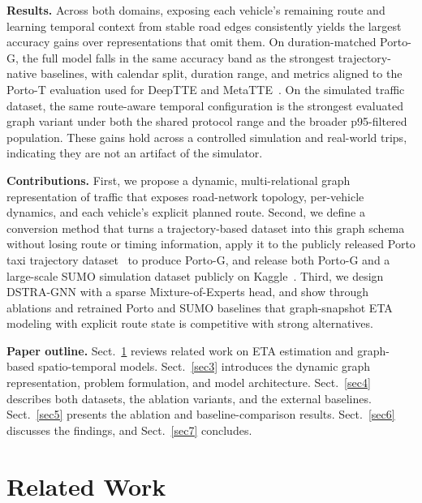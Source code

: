 \documentclass[pdflatex,sn-basic,Numbered]{sn-jnl}%
\begin{document}
\textbf{Results.} Across both domains, exposing each vehicle's remaining route and learning temporal context from stable road edges consistently yields the largest accuracy gains over representations that omit them. On duration-matched Porto-G, the full model falls in the same accuracy band as the strongest trajectory-native baselines, with calendar split, duration range, and metrics aligned to the Porto-T evaluation used for DeepTTE and MetaTTE~\cite{deepTTE2018,wang2022metatte}. On the simulated traffic dataset, the same route-aware temporal configuration is the strongest evaluated graph variant under both the shared protocol range and the broader p95-filtered population. These gains hold across a controlled simulation and real-world trips, indicating they are not an artifact of the simulator.

\textbf{Contributions.} First, we propose a dynamic, multi-relational graph representation of traffic that exposes road-network topology, per-vehicle dynamics, and each vehicle's explicit planned route. Second, we define a conversion method that turns a trajectory-based dataset into this graph schema without losing route or timing information, apply it to the publicly released Porto taxi trajectory dataset~\cite{moreira2013porto} to produce Porto-G, and release both Porto-G and a large-scale SUMO simulation dataset publicly on Kaggle~\cite{tordjman2026sumokaggle,tordjman2026portokaggle}. Third, we design DSTRA-GNN with a sparse Mixture-of-Experts head, and show through ablations and retrained Porto and SUMO baselines that graph-snapshot ETA modeling with explicit route state is competitive with strong alternatives.

\textbf{Paper outline.} Sect.~\ref{sec2} reviews related work on ETA estimation and graph-based spatio-temporal models. Sect.~\ref{sec3} introduces the dynamic graph representation, problem formulation, and model architecture. Sect.~\ref{sec4} describes both datasets, the ablation variants, and the external baselines. Sect.~\ref{sec5} presents the ablation and baseline-comparison results. Sect.~\ref{sec6} discusses the findings, and Sect.~\ref{sec7} concludes.




\section{Related Work}\label{sec2}
\end{document}
